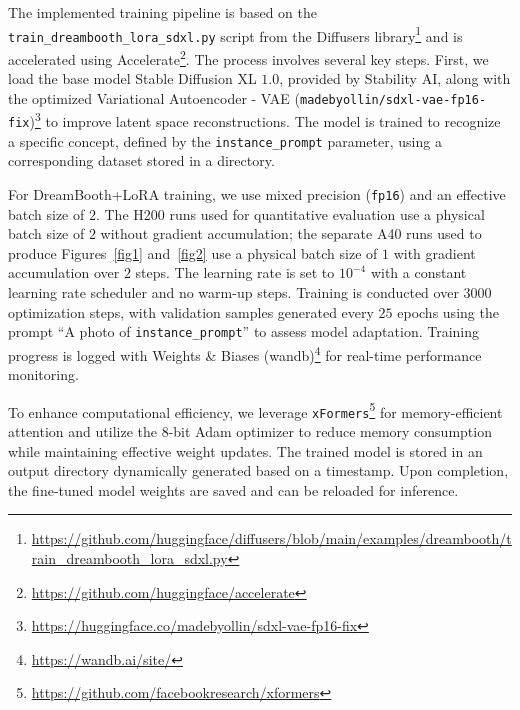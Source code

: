 \documentclass[pdflatex,sn-mathphys-num]{sn-jnl}%
\theoremstyle{thmstyleone}%
\theoremstyle{thmstyletwo}%
\theoremstyle{thmstylethree}%
\begin{document}
The implemented training pipeline is based on the \texttt{train\_dreambooth\_lora\_sdxl.py} script from the Diffusers library\footnote{\url{https://github.com/huggingface/diffusers/blob/main/examples/dreambooth/train_dreambooth_lora_sdxl.py}} and is accelerated using Accelerate\footnote{\url{https://github.com/huggingface/accelerate}}. The process involves several key steps. First, we load the base model Stable Diffusion XL $1.0$, provided by Stability AI, along with the optimized Variational Autoencoder - VAE (\texttt{madebyollin/sdxl-vae-fp16-fix})\footnote{\url{https://huggingface.co/madebyollin/sdxl-vae-fp16-fix}} to improve latent space reconstructions. The model is trained to recognize a specific concept, defined by the \texttt{instance\_prompt} parameter, using a corresponding dataset stored in a directory.

For DreamBooth+LoRA training, we use mixed precision (\texttt{fp16}) and an effective batch size of $2$. The H200 runs used for quantitative evaluation use a physical batch size of $2$ without gradient accumulation; the separate A40 runs used to produce Figures~\ref{fig1} and~\ref{fig2} use a physical batch size of $1$ with gradient accumulation over $2$ steps. The learning rate is set to $10^{-4}$ with a constant learning rate scheduler and no warm-up steps. Training is conducted over $3000$ optimization steps, with validation samples generated every $25$ epochs using the prompt ``A photo of \texttt{instance\_prompt}'' to assess model adaptation. Training progress is logged with Weights \& Biases (wandb)\footnote{\url{https://wandb.ai/site/}} for real-time performance monitoring.

To enhance computational efficiency, we leverage \texttt{xFormers}\footnote{\url{https://github.com/facebookresearch/xformers}} for memory-efficient attention and utilize the $8$-bit Adam optimizer to reduce memory consumption while maintaining effective weight updates. The trained model is stored in an output directory dynamically generated based on a timestamp. Upon completion, the fine-tuned model weights are saved and can be reloaded for inference.
\end{document}
